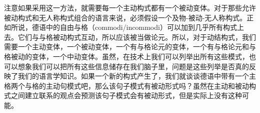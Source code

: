 注意如果采用这一方法，就需要每一个主动构式都有一个被动变体。对于那些允许被动构式和无人称构式组合的语言来说，必须假设一个及物-被动-无人称构式。正如所说，德语中的自由与格（commodi/incommodi）可以加到几乎所有构式上去。它们与与格被动构式互动，所以应该被当做论元。所以，对于动结构式，我们需要一个主动变体，一个被动变体，一个有与格论元的变体，一个有与格论元和与格被动的变体，一个中动变体。虽然，在技术上我们可以列举出所有这些模式，也可以想象我们可以把所有这些信息储存在我们脑子里，问题是这些列举是否真的反映了我们的语言学知识。如果一个新的构式产生了，我们就谈谈德语中带有一个主格两个与格的主动句模式吧，那么该句子模式有被动形式吗？虽然在主动和被动构式之间建立联系的观点会预测该句子模式会有被动形式，但是实际上没有这种可能。


